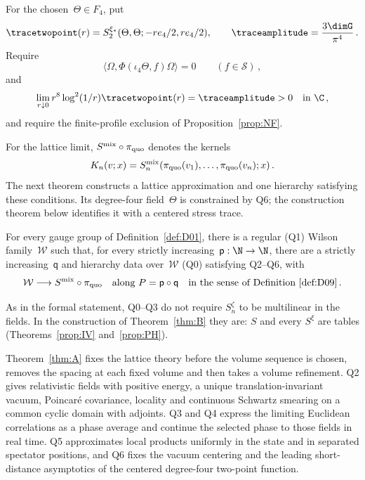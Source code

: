 \begin{definition}\label{def:Q6}
For the chosen~$\Theta\in F_4$, put
\begin{equation*}
\tracetwopoint(r)=S_2^{\xi_*}(\Theta,\Theta;-re_4/2,re_4/2),\qquad
\traceamplitude=\frac{3\dimG}{\pi^4}\,.
\end{equation*}
Require
\begin{equation*}
\langle\Omega,\Phi(\iota_4\Theta,f)\Omega\rangle=0\qquad(f\in\mathcal S)\,,
\end{equation*}
and
\begin{equation*}
\lim_{r\downarrow0}r^8\log^2(1/r)\tracetwopoint(r)=\traceamplitude>0
\quad\text{in }\C\,,
\end{equation*}
and require the finite-profile exclusion of Proposition~\ref{prop:NF}.
\end{definition}

For the lattice limit, $S^{\rm mix}\circ\pi_{\rm quo}$ denotes the kernels
\begin{equation*}
K_n(v;x)=S_n^{\rm mix}(\pi_{\rm quo}(v_1),\ldots,\pi_{\rm quo}(v_n);x)\,.
\end{equation*}
The next theorem constructs a lattice approximation and one hierarchy satisfying these conditions. Its degree-four field~$\Theta$ is constrained by Q6; the construction theorem below identifies it with a centered stress trace.

\begin{maintheorem}[Existence]\label{thm:A}
For every gauge group of Definition~\ref{def:D01}, there is a regular \textup{(Q1)} Wilson family~$\mathcal W$ such that, for every strictly increasing~$\mathsf p:\N\to\N$, there are a strictly increasing~$\mathsf q$ and hierarchy data over~$\mathcal W$ \textup{(Q0)} satisfying \textup{Q2--Q6}, with
\begin{equation*}
\mathcal W\longrightarrow S^{\rm mix}\circ\pi_{\rm quo}
\quad\text{along }P=\mathsf p\circ\mathsf q
\quad\text{in the sense of Definition~\ref{def:D09}}\,.
\end{equation*}
\end{maintheorem}

As in the formal statement, Q0--Q3 do not require $S_n^\zeta$ to be multilinear in the fields. In the construction of Theorem~\ref{thm:B} they are: $S$ and every $S^\xi$ are tables (Theorems~\ref{prop:IV} and~\ref{prop:PH}).

Theorem~\ref{thm:A} fixes the lattice theory before the volume sequence is chosen, removes the spacing at each fixed volume and then takes a volume refinement. Q2 gives relativistic fields with positive energy, a unique translation-invariant vacuum, Poincar\'e covariance, locality and continuous Schwartz smearing on a common cyclic domain with adjoints. Q3 and Q4 express the limiting Euclidean correlations as a phase average and continue the selected phase to those fields in real time. Q5 approximates local products uniformly in the state and in separated spectator positions, and Q6 fixes the vacuum centering and the leading short-distance asymptotics of the centered degree-four two-point function.

